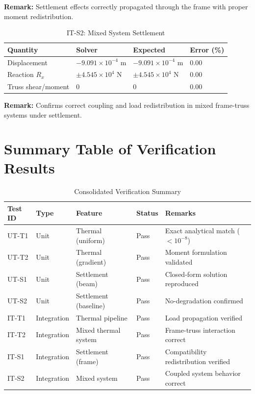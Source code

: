 \textbf{Remark:} Settlement effects correctly propagated through the frame with proper moment redistribution.

\vspace{0.4cm}

\begin{table}[H]
\centering
\caption{IT-S2: Mixed System Settlement}
\begin{tabular}{llll}
\toprule
Quantity & Solver & Expected & Error (\%) \\
\midrule
Displacement & $-9.091 \times 10^{-4}$ m & $-9.091 \times 10^{-4}$ m & 0.00 \\
Reaction $R_x$ & $\pm 4.545 \times 10^{4}$ N & $\pm 4.545 \times 10^{4}$ N & 0.00 \\
Truss shear/moment & 0 & 0 & 0.00 \\
\bottomrule
\end{tabular}
\end{table}

\textbf{Remark:} Confirms correct coupling and load redistribution in mixed frame-truss systems under settlement.

\section{Summary Table of Verification Results}

\begin{table}[H]
    \centering
    \caption{Consolidated Verification Summary}
    \label{tab:verification_summary}
    \begin{tabular}{lllll}
        \toprule
        Test ID & Type & Feature & Status & Remarks \\
        \midrule
        UT-T1 & Unit & Thermal (uniform) & Pass & Exact analytical match ($<10^{-8}$) \\
        UT-T2 & Unit & Thermal (gradient) & Pass & Moment formulation validated \\
        UT-S1 & Unit & Settlement (beam) & Pass & Closed-form solution reproduced \\
        UT-S2 & Unit & Settlement (baseline) & Pass & No-degradation confirmed \\
        IT-T1 & Integration & Thermal pipeline & Pass & Load propagation verified \\
        IT-T2 & Integration & Mixed thermal system & Pass & Frame-truss interaction correct \\
        IT-S1 & Integration & Settlement (frame) & Pass & Compatibility redistribution verified \\
        IT-S2 & Integration & Mixed system & Pass & Coupled system behavior correct \\
        \bottomrule
    \end{tabular}
\end{table}

